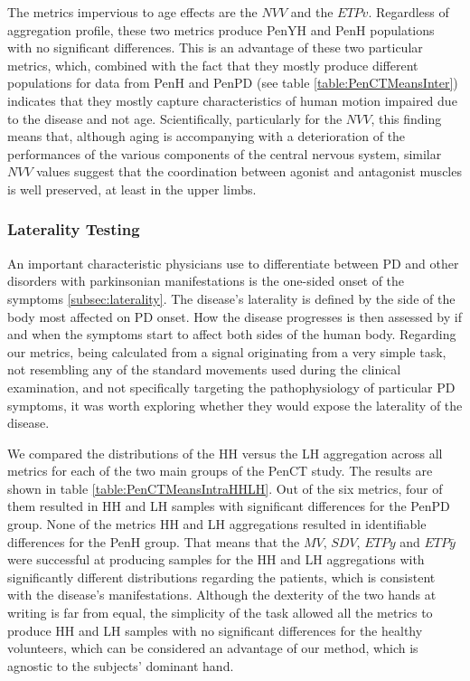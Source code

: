 The metrics impervious to age effects are the $NVV$ and the $ETPv$. Regardless of aggregation profile, these two metrics produce \gls{PenYH} and \gls{PenH} populations with no significant differences. This is an advantage of these two particular metrics, which, combined with the fact that they mostly produce different populations for data from \gls{PenH} and \gls{PenPD} (see table \ref{table:PenCTMeansInter}) indicates that they mostly capture characteristics of human motion impaired due to the disease and not age. Scientifically, particularly for the $NVV$, this finding means that, although aging is accompanying with a deterioration of the performances of the various components of the central nervous system, similar $NVV$ values suggest that the coordination between agonist and antagonist muscles is well preserved, at least in the upper limbs.

\subsubsection{Laterality Testing}
\label{subsubsec:PenCTLateralityTesting}
An important characteristic physicians use to differentiate between \gls{PD} and other disorders with parkinsonian manifestations is the one-sided onset of the symptoms \ref{subsec:laterality}. The disease's laterality is defined by the side of the body most affected on \gls{PD} onset. How the disease progresses is then assessed by if and when the symptoms start to affect both sides of the human body. Regarding our metrics, being calculated from a signal originating from a very simple task, not resembling any of the standard movements used during the clinical examination, and not specifically targeting the pathophysiology of particular \gls{PD} symptoms, it was worth exploring whether they would expose the laterality of the disease.

We compared the distributions of the HH versus the LH aggregation across all metrics for each of the two main groups of the \gls{PenCT} study. The results are shown in table \ref{table:PenCTMeansIntraHHLH}. Out of the six metrics, four of them resulted in HH and LH samples with significant differences for the \gls{PenPD} group. None of the metrics HH and LH aggregations resulted in identifiable differences for the \gls{PenH} group. That means that the $MV$, $SDV$, $ETPy$ and $ETP\bar{y}$ were successful at producing samples for the HH and LH aggregations with significantly different distributions regarding the patients, which is consistent with the disease's manifestations. Although the dexterity of the two hands at writing is far from equal, the simplicity of the task allowed all the metrics to produce HH and LH samples with no significant differences for the healthy volunteers, which can be considered an advantage of our method, which is agnostic to the subjects' dominant hand.

